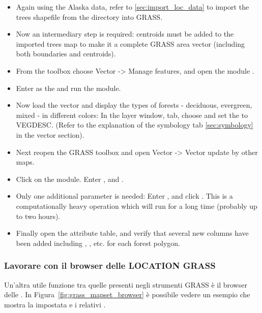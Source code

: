 \begin{itemize}
\item Again using the Alaska data, refer to \ref{sec:import_loc_data} to
import the trees shapefile from the  directory
into GRASS. 
\item Now an intermediary step is required: centroids must be added to the
imported trees map to make it a complete GRASS area vector (including both
boundaries and centroids). 
\item From the toolbox choose Vector -> Manage features, and open the
module . 
\item Enter as the 
and run the module. 
\item Now load the  vector and display the types of
forests - deciduous, evergreen, mixed - in different colors: In the layer
 window,  tab, choose
 and set the
 to VEGDESC. (Refer to the
explanation of the symbology tab \ref{sec:symbology} in the vector section).
\item Next reopen the GRASS toolbox and open Vector -> Vector update by other
maps.
\item Click on the  module. Enter , and . 
\item Only one additional parameter is needed: Enter , and click . This is a computationally
heavy operation which will run for a long time (probably up to two hours).
\item Finally open the  attribute table, and verify
that several new columns have been added including ,
,  etc. for each forest polygon.
\end{itemize}

\subsubsection{Lavorare con il browser delle LOCATION GRASS} 

Un'altra utile funzione tra quelle presenti negli strumenti GRASS è il browser
delle . In Figura~\ref{fig:grass_mapset_browser} è
possibile vedere un esempio che mostra la  impostata 
e i relativi .

